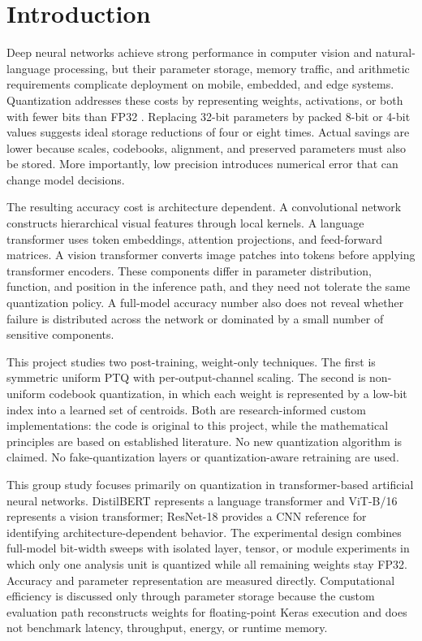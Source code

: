 \documentclass[conference]{IEEEtran}
\begin{document}
\section{Introduction}

Deep neural networks achieve strong performance in computer vision and natural-language processing, but their parameter storage, memory traffic, and arithmetic requirements complicate deployment on mobile, embedded, and edge systems. Quantization addresses these costs by representing weights, activations, or both with fewer bits than FP32 \cite{jacob2018,krishnamoorthi2018,nagel2021}. Replacing 32-bit parameters by packed 8-bit or 4-bit values suggests ideal storage reductions of four or eight times. Actual savings are lower because scales, codebooks, alignment, and preserved parameters must also be stored. More importantly, low precision introduces numerical error that can change model decisions.

The resulting accuracy cost is architecture dependent. A convolutional network constructs hierarchical visual features through local kernels. A language transformer uses token embeddings, attention projections, and feed-forward matrices. A vision transformer converts image patches into tokens before applying transformer encoders. These components differ in parameter distribution, function, and position in the inference path, and they need not tolerate the same quantization policy. A full-model accuracy number also does not reveal whether failure is distributed across the network or dominated by a small number of sensitive components.

This project studies two post-training, weight-only techniques. The first is symmetric uniform PTQ with per-output-channel scaling. The second is non-uniform codebook quantization, in which each weight is represented by a low-bit index into a learned set of centroids. Both are research-informed custom implementations: the code is original to this project, while the mathematical principles are based on established literature. No new quantization algorithm is claimed. No fake-quantization layers or quantization-aware retraining are used.

This group study focuses primarily on quantization in transformer-based artificial neural networks. DistilBERT represents a language transformer and ViT-B/16 represents a vision transformer; ResNet-18 provides a CNN reference for identifying architecture-dependent behavior. The experimental design combines full-model bit-width sweeps with isolated layer, tensor, or module experiments in which only one analysis unit is quantized while all remaining weights stay FP32. Accuracy and parameter representation are measured directly. Computational efficiency is discussed only through parameter storage because the custom evaluation path reconstructs weights for floating-point Keras execution and does not benchmark latency, throughput, energy, or runtime memory.
\end{document}

